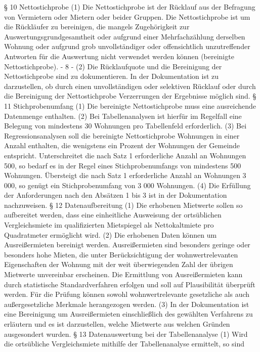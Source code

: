 § 10
Nettostichprobe
(1) Die Nettostichprobe ist der Rücklauf aus der Befragung von Vermietern oder Mietern oder beider Gruppen. Die Nettostichprobe ist um die Rückläufer zu bereinigen, die
mangels Zugehörigkeit zur Auswertungsgrundgesamtheit oder aufgrund einer Mehrfachzählung derselben Wohnung oder aufgrund grob unvollständiger oder offensichtlich unzutreffender Antworten für die Auswertung nicht verwendet werden können (bereinigte Nettostichprobe).
- 8 -
(2) Die Rücklaufquote und die Bereinigung der Nettostichprobe sind zu dokumentieren. In der Dokumentation ist zu darzustellen, ob durch einen unvollständigen oder selektiven Rücklauf oder durch die Bereinigung der Nettostichprobe Verzerrungen der Ergebnisse möglich sind.
§ 11
Stichprobenumfang
(1) Die bereinigte Nettostichprobe muss eine ausreichende Datenmenge enthalten.
(2) Bei Tabellenanalysen ist hierfür im Regelfall eine Belegung von mindestens 30
Wohnungen pro Tabellenfeld erforderlich.
(3) Bei Regressionsanalysen soll die bereinigte Nettostichprobe Wohnungen in einer
Anzahl enthalten, die wenigstens ein Prozent der Wohnungen der Gemeinde entspricht.
Unterschreitet die nach Satz 1 erforderliche Anzahl an Wohnungen 500, so bedarf es in der
Regel eines Stichprobenumfangs von mindestens 500 Wohnungen. Übersteigt die nach
Satz 1 erforderliche Anzahl an Wohnungen 3 000, so genügt ein Stichprobenumfang von
3 000 Wohnungen.
(4) Die Erfüllung der Anforderungen nach den Absätzen 1 bis 3 ist in der Dokumentation nachzuweisen.
§ 12
Datenaufbereitung
(1) Die erhobenen Mietwerte sollen so aufbereitet werden, dass eine einheitliche Ausweisung der ortsüblichen Vergleichsmiete im qualifizierten Mietspiegel als Nettokaltmiete
pro Quadratmeter ermöglicht wird.
(2) Die erhobenen Daten können um Ausreißermieten bereinigt werden. Ausreißermieten sind besonders geringe oder besonders hohe Mieten, die unter Berücksichtigung
der wohnwertrelevanten Eigenschaften der Wohnung mit der weit überwiegenden Zahl der
übrigen Mietwerte unvereinbar erscheinen. Die Ermittlung von Ausreißermieten kann durch
statistische Standardverfahren erfolgen und soll auf Plausibilität überprüft werden. Für die
Prüfung können sowohl wohnwertrelevante gesetzliche als auch außergesetzliche Merkmale herangezogen werden.
(3) In der Dokumentation ist eine Bereinigung um Ausreißermieten einschließlich des
gewählten Verfahrens zu erläutern und es ist darzustellen, welche Mietwerte aus welchen
Gründen ausgesondert wurden.
§ 13
Datenauswertung bei der Tabellenanalyse
(1) Wird die ortsübliche Vergleichsmiete mithilfe der Tabellenanalyse ermittelt, so sind
